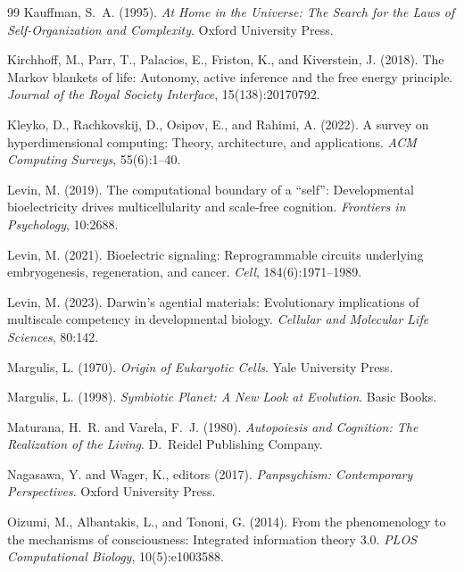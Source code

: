 \documentclass[12pt,a4paper]{article}
\begin{document}
\begin{thebibliography}{99}
Kauffman, S.~A. (1995).
\newblock \emph{At Home in the Universe: The Search for the Laws of
  Self-Organization and Complexity}.
\newblock Oxford University Press.

Kirchhoff, M., Parr, T., Palacios, E., Friston, K., and Kiverstein, J.
  (2018).
\newblock The Markov blankets of life: Autonomy, active inference and the
  free energy principle.
\newblock \emph{Journal of the Royal Society Interface},
  15(138):20170792.

Kleyko, D., Rachkovskij, D., Osipov, E., and Rahimi, A. (2022).
\newblock A survey on hyperdimensional computing: Theory, architecture,
  and applications.
\newblock \emph{ACM Computing Surveys}, 55(6):1--40.

Levin, M. (2019).
\newblock The computational boundary of a ``self'': Developmental
  bioelectricity drives multicellularity and scale-free cognition.
\newblock \emph{Frontiers in Psychology}, 10:2688.

Levin, M. (2021).
\newblock Bioelectric signaling: Reprogrammable circuits underlying
  embryogenesis, regeneration, and cancer.
\newblock \emph{Cell}, 184(6):1971--1989.

Levin, M. (2023).
\newblock Darwin's agential materials: Evolutionary implications of
  multiscale competency in developmental biology.
\newblock \emph{Cellular and Molecular Life Sciences}, 80:142.

Margulis, L. (1970).
\newblock \emph{Origin of Eukaryotic Cells}.
\newblock Yale University Press.

Margulis, L. (1998).
\newblock \emph{Symbiotic Planet: A New Look at Evolution}.
\newblock Basic Books.

Maturana, H.~R. and Varela, F.~J. (1980).
\newblock \emph{Autopoiesis and Cognition: The Realization of the Living}.
\newblock D.~Reidel Publishing Company.

Nagasawa, Y. and Wager, K., editors (2017).
\newblock \emph{Panpsychism: Contemporary Perspectives}.
\newblock Oxford University Press.

Oizumi, M., Albantakis, L., and Tononi, G. (2014).
\newblock From the phenomenology to the mechanisms of consciousness:
  Integrated information theory 3.0.
\newblock \emph{PLOS Computational Biology}, 10(5):e1003588.


\end{thebibliography}
\end{document}
